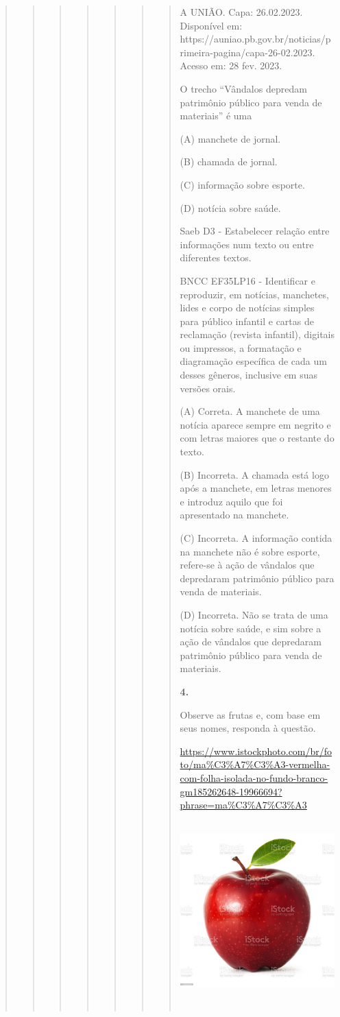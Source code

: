 \begin{quote}
\begin{quote}
\begin{quote}
\begin{quote}
\begin{quote}
\begin{quote}
\begin{quote}
A UNIÃO. Capa: 26.02.2023. Disponível em:
https://auniao.pb.gov.br/noticias/primeira-pagina/capa-26-02.2023.
Acesso em: 28 fev. 2023.

O trecho ``Vândalos depredam patrimônio público para venda de
materiais'' é uma

(A) manchete de jornal.

(B) chamada de jornal.

(C) informação sobre esporte.

(D) notícia sobre saúde.

Saeb D3 - Estabelecer relação entre informações num texto ou entre
diferentes textos.

BNCC EF35LP16 - Identificar e reproduzir, em notícias, manchetes, lides
e corpo de notícias simples para público infantil e cartas de reclamação
(revista infantil), digitais ou impressos, a formatação e diagramação
específica de cada um desses gêneros, inclusive em suas versões orais.

(A) Correta. A manchete de uma notícia aparece sempre em negrito e com
letras maiores que o restante do texto.

(B) Incorreta. A chamada está logo após a manchete, em letras menores e
introduz aquilo que foi apresentado na manchete.

(C) Incorreta. A informação contida na manchete não é sobre esporte,
refere-se à \protect\hypertarget{_Hlk128473874}{}{}ação de vândalos que
depredaram patrimônio público para venda de materiais.

(D) Incorreta. Não se trata de uma notícia sobre saúde, e sim sobre a
ação de vândalos que depredaram patrimônio público para venda de
materiais.

\textbf{4.}

Observe as frutas e, com base em seus nomes, responda à questão.

\href{https://www.istockphoto.com/br/foto/ma\%C3\%A7\%C3\%A3-vermelha-com-folha-isolada-no-fundo-branco-gm185262648-19966694?phrase=ma\%C3\%A7\%C3\%A3}{https://www.istockphoto.com/br/foto/ma\%C3\%A7\%C3\%A3-vermelha-com-folha-isolada-no-fundo-branco-gm185262648-19966694?phrase=ma\%C3\%A7\%C3\%A3\includegraphics[width=2.98958in,height=2.98958in]{media/image38.jpeg}}


\end{quote}
\end{quote}
\end{quote}
\end{quote}
\end{quote}
\end{quote}
\end{quote}
